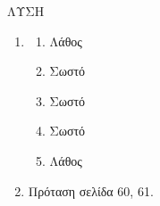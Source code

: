 ΛΥΣΗ
\begin{enumerate}[label=\alph*)]
    \item
    \begin{enumerate}[label=\roman*.]
        \item Λάθος
        \item Σωστό
        \item Σωστό
        \item Σωστό
        \item Λάθος
    \end{enumerate}
    \item Πρόταση σελίδα 60, 61.
\end{enumerate}